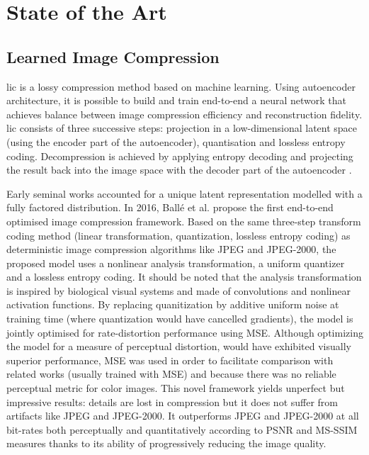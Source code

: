 \chapter{State of the Art}
\label{sota}

\section{Learned Image Compression}
\acrfull{lic} is a lossy compression method based on machine learning. Using autoencoder architecture, it is possible to build and train end-to-end a neural network that achieves balance between image compression efficiency and reconstruction fidelity. \acrshort{lic} consists of three successive steps: projection in a low-dimensional latent space (using the encoder part of the autoencoder), quantisation and lossless entropy coding. Decompression is achieved by applying entropy decoding and projecting the result back into the image space with the decoder part of the autoencoder \cite{licmedium, licstanford}.

Early seminal works accounted for a unique latent representation modelled with a fully factored distribution. In 2016, Ballé et al. \cite{ballé2017endtoendoptimizedimagecompression} propose the first end-to-end optimised image compression framework. Based on the same three-step transform coding method (linear transformation, quantization, lossless entropy coding) as deterministic image compression algorithms like JPEG and JPEG-2000, the proposed model uses a nonlinear analysis transformation, a uniform quantizer and a lossless entropy coding. It should be noted that the analysis transformation is inspired by biological visual systems and made of convolutions and nonlinear activation functions. By replacing quanitization by additive uniform noise at training time (where quantization would have cancelled gradients), the model is jointly optimised for rate-distortion performance using MSE. Although optimizing the model for a measure of perceptual distortion, would have exhibited visually superior performance, MSE was used in order to facilitate comparison with related works (usually trained with MSE) and because there was no reliable perceptual metric for color images. This novel framework yields unperfect but impressive results: details are lost in compression but it does not suffer from artifacts like JPEG and JPEG-2000. It outperforms JPEG and JPEG-2000 at all bit-rates both perceptually and quantitatively according to PSNR and MS-SSIM measures thanks to its ability of progressively reducing the image quality.

